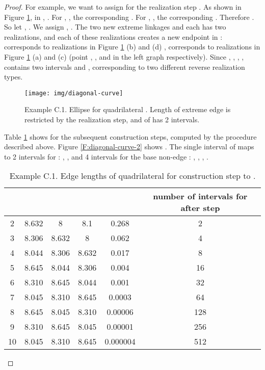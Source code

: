 \documentclass[secthm,amsthm,english]{article}
\theoremstyle{definition}
\theoremstyle{remark}
\begin{document}
\begin{proof}
For example, we want to assign  for the  realization step .
As shown in Figure \ref{F:diagonal-curve}, in , . 
For , , the corresponding . For , , the corresponding . 
Therefore .
So let ,
.
We assign , .
The two new extreme linkages  and
 each has two realizations, and each
of these realizations creates a new endpoint in  :
 corresponds to realizations in Figure
\ref{F:diagonal-curve} (b) and (d) , 
corresponds to realizations in Figure \ref{F:diagonal-curve} (a)
and (c) (point , ,  and  in the left graph respectively).
Since , ,
, ,
 contains two intervals 
and , 
corresponding to two different reverse realization types. 


\begin{figure}[h]
	
	  
	 
	
	\begin{centering}
	\texttt{[image: img/diagonal-curve]} 
	\par\end{centering}
	
	\caption{Example C.1. Ellipse  for quadrilateral .
	Length of extreme edge  is restricted by the 
	 realization step, and of  has
	2 intervals. }

\label{F:diagonal-curve} 
\end{figure}



Table \ref{T:edge-length} shows  for
the subsequent construction steps, computed by the procedure described above. 
Figure \ref{F:diagonal-curve-2} shows . 
The single interval of  maps to 2 intervals
for : , ,
and 4 intervals for the base non-edge :
, , ,
. 

\begin{centering}
\begin{table}
	\begin{tabular}{|c|c|c|c|c|c|}
	\hline 
	 &  &  &  &  & number of intervals for  after step  \\
	\hline
	\hline 
	2 & 8.632 & 8 & 8.1 & 0.268 & 2 \\
	\hline 
	3 & 8.306 & 8.632 & 8 & 0.062 & 4 \\
	\hline 
	4 & 8.044 & 8.306 & 8.632 & 0.017 & 8\\
	\hline 
	5 & 8.645 & 8.044 & 8.306 & 0.004 & 16\\
	\hline 
	6 & 8.310 & 8.645 & 8.044 & 0.001 & 32\\
	\hline 
	7 & 8.045 & 8.310 & 8.645 & 0.0003 & 64\\
	\hline 
	8 & 8.645 & 8.045 & 8.310 & 0.00006 & 128\\
	\hline 
	9 & 8.310 & 8.645 & 8.045 & 0.00001 & 256\\
	\hline 
	10 & 8.045 & 8.310 & 8.645 & 0.000004 & 512\\
	\hline
	\end{tabular}
\medskip	
\caption{Example C.1. Edge lengths of quadrilateral  for construction step  to .}
\label{T:edge-length}
\end{table}
\end{centering}


\end{proof}
\end{document}
